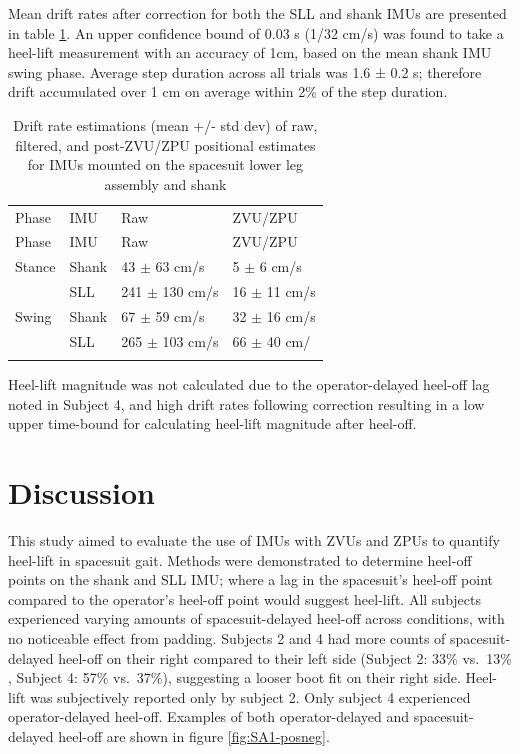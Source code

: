 \documentclass[defaultstyle,11pt]{thesis}
\begin{document}
Mean drift rates after correction for both the SLL and shank IMUs are presented in table \ref{tbl:SA1-drift}. An upper confidence bound of 0.03 s (1/32 cm/s) was found to take a heel-lift measurement with an accuracy of 1cm, based on the mean shank IMU swing phase. Average step duration across all trials was 1.6 ± 0.2 s; therefore drift accumulated over 1 cm on average within 2\% of the step duration.

\hypertarget{tbl:SA1-drift}{}
\begin{longtable}[]{@{}llll@{}}
\caption{\label{tbl:SA1-drift}Drift rate estimations (mean +/- std dev) of raw, filtered, and post-ZVU/ZPU positional estimates for IMUs mounted on the spacesuit lower leg assembly and shank}\tabularnewline
\toprule
Phase & IMU & Raw & ZVU/ZPU \\ \addlinespace
\midrule
\endfirsthead
\toprule
Phase & IMU & Raw & ZVU/ZPU \\ \addlinespace
\midrule
\endhead
Stance & Shank & 43 \(\pm\) 63 cm/s & 5 \(\pm\) 6 cm/s \\ \addlinespace
& SLL & 241 \(\pm\) 130 cm/s & 16 \(\pm\) 11 cm/s \\ \addlinespace
Swing & Shank & 67 \(\pm\) 59 cm/s & 32 \(\pm\) 16 cm/s \\ \addlinespace
& SLL & 265 \(\pm\) 103 cm/s & 66 \(\pm\) 40 cm/ \\ \addlinespace
\bottomrule
\end{longtable}

Heel-lift magnitude was not calculated due to the operator-delayed heel-off lag noted in Subject 4, and high drift rates following correction resulting in a low upper time-bound for calculating heel-lift magnitude after heel-off.

\pagebreak

\hypertarget{discussion}{%
\section{Discussion}\label{discussion}}

This study aimed to evaluate the use of IMUs with ZVUs and ZPUs to quantify heel-lift in spacesuit gait.
Methods were demonstrated to determine heel-off points on the shank and SLL IMU; where a lag in the spacesuit's heel-off point compared to the operator's heel-off point would suggest heel-lift.
All subjects experienced varying amounts of spacesuit-delayed heel-off across conditions, with no noticeable effect from padding.
Subjects 2 and 4 had more counts of spacesuit-delayed heel-off on their right compared to their left side (Subject 2: 33\% vs.~13\% , Subject 4: 57\% vs.~37\%), suggesting a looser boot fit on their right side.
Heel-lift was subjectively reported only by subject 2.
Only subject 4 experienced operator-delayed heel-off.
Examples of both operator-delayed and spacesuit-delayed heel-off are shown in figure \ref{fig:SA1-posneg}.
\end{document}
